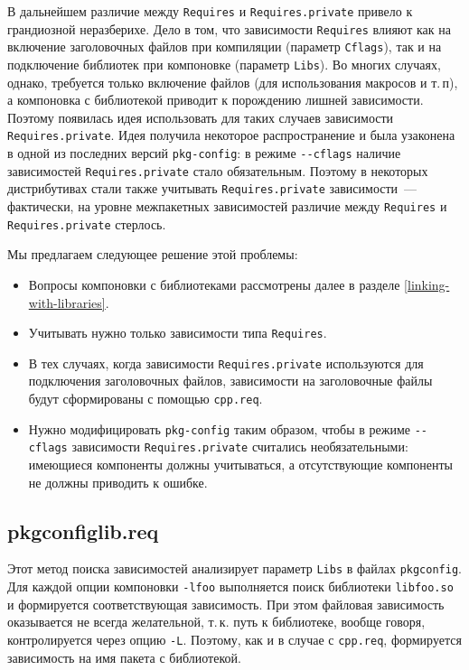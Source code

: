 \documentclass[russian,a4paper,12pt,titlepage]{article}
\begin{document}
В дальнейшем различие между \verb|Requires| и \verb|Requires.private| привело к грандиозной неразберихе.
Дело в том, что зависимости \verb|Requires| влияют как на включение заголовочных файлов при компиляции (параметр \verb|Cflags|),
так и на подключение библиотек при компоновке (параметр \verb|Libs|).  Во многих случаях, однако, требуется только
включение файлов (для использования макросов и т.\,п), а компоновка с библиотекой приводит к порождению лишней зависимости.
Поэтому появилась идея использовать для таких случаев зависимости \verb|Requires.private|.
Идея получила некоторое распространение и была узаконена в одной из последних версий \verb|pkg-config|: в режиме
\verb|--cflags| наличие зависимостей \verb|Requires.private| стало обязательным.  Поэтому в некоторых дистрибутивах
стали также учитывать \verb|Requires.private| зависимости~--- фактически, на уровне межпакетных зависимостей различие
между \verb|Requires| и \verb|Requires.private| стерлось.

Мы предлагаем следующее решение этой проблемы:
\begin{itemize}
\item Вопросы компоновки с библиотеками рассмотрены далее в разделе \ref{linking-with-libraries}.
\item Учитывать нужно только зависимости типа \verb|Requires|.
\item В тех случаях, когда зависимости \verb|Requires.private| используются для подключения заголовочных файлов,
зависимости на заголовочные файлы будут сформированы с помощью \verb|cpp.req|.
\item Нужно модифицировать \verb|pkg-config| таким образом, чтобы в режиме \verb|--cflags| зависимости
\verb|Requires.private| считались необязательными: имеющиеся компоненты должны учитываться, а отсутствующие
компоненты не должны приводить к ошибке.
\end{itemize}

\subsection{pkgconfiglib.req}
\label{pkgconfiglib-req}
Этот метод поиска зависимостей анализирует параметр \verb|Libs| в файлах \verb|pkgconfig|.
Для каждой опции компоновки \verb|-lfoo| выполняется поиск библиотеки \verb|libfoo.so| и формируется соответствующая зависимость.
При этом файловая зависимость оказывается не всегда желательной, т.\,к. путь к библиотеке, вообще говоря,
контролируется через опцию \verb|-L|.  Поэтому, как и в случае с \verb|cpp.req|, формируется зависимость на
имя пакета с библиотекой.
\end{document}
